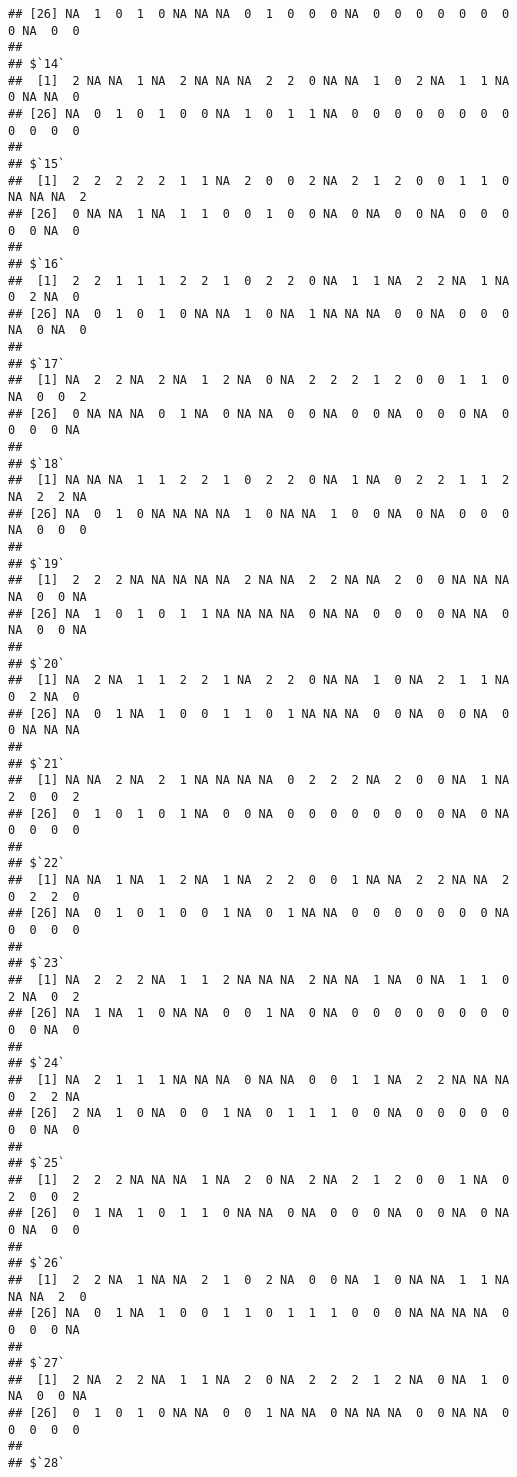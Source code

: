 \documentclass[
]{article}
\begin{document}
\begin{verbatim}
## [26] NA  1  0  1  0 NA NA NA  0  1  0  0  0 NA  0  0  0  0  0  0  0  0 NA  0  0
## 
## $`14`
##  [1]  2 NA NA  1 NA  2 NA NA NA  2  2  0 NA NA  1  0  2 NA  1  1 NA  0 NA NA  0
## [26] NA  0  1  0  1  0  0 NA  1  0  1  1 NA  0  0  0  0  0  0  0  0  0  0  0  0
## 
## $`15`
##  [1]  2  2  2  2  2  1  1 NA  2  0  0  2 NA  2  1  2  0  0  1  1  0 NA NA NA  2
## [26]  0 NA NA  1 NA  1  1  0  0  1  0  0 NA  0 NA  0  0 NA  0  0  0  0  0 NA  0
## 
## $`16`
##  [1]  2  2  1  1  1  2  2  1  0  2  2  0 NA  1  1 NA  2  2 NA  1 NA  0  2 NA  0
## [26] NA  0  1  0  1  0 NA NA  1  0 NA  1 NA NA NA  0  0 NA  0  0  0 NA  0 NA  0
## 
## $`17`
##  [1] NA  2  2 NA  2 NA  1  2 NA  0 NA  2  2  2  1  2  0  0  1  1  0 NA  0  0  2
## [26]  0 NA NA NA  0  1 NA  0 NA NA  0  0 NA  0  0 NA  0  0  0 NA  0  0  0  0 NA
## 
## $`18`
##  [1] NA NA NA  1  1  2  2  1  0  2  2  0 NA  1 NA  0  2  2  1  1  2 NA  2  2 NA
## [26] NA  0  1  0 NA NA NA NA  1  0 NA NA  1  0  0 NA  0 NA  0  0  0 NA  0  0  0
## 
## $`19`
##  [1]  2  2  2 NA NA NA NA NA  2 NA NA  2  2 NA NA  2  0  0 NA NA NA NA  0  0 NA
## [26] NA  1  0  1  0  1  1 NA NA NA NA  0 NA NA  0  0  0  0 NA NA  0 NA  0  0 NA
## 
## $`20`
##  [1] NA  2 NA  1  1  2  2  1 NA  2  2  0 NA NA  1  0 NA  2  1  1 NA  0  2 NA  0
## [26] NA  0  1 NA  1  0  0  1  1  0  1 NA NA NA  0  0 NA  0  0 NA  0  0 NA NA NA
## 
## $`21`
##  [1] NA NA  2 NA  2  1 NA NA NA NA  0  2  2  2 NA  2  0  0 NA  1 NA  2  0  0  2
## [26]  0  1  0  1  0  1 NA  0  0 NA  0  0  0  0  0  0  0  0 NA  0 NA  0  0  0  0
## 
## $`22`
##  [1] NA NA  1 NA  1  2 NA  1 NA  2  2  0  0  1 NA NA  2  2 NA NA  2  0  2  2  0
## [26] NA  0  1  0  1  0  0  1 NA  0  1 NA NA  0  0  0  0  0  0  0 NA  0  0  0  0
## 
## $`23`
##  [1] NA  2  2  2 NA  1  1  2 NA NA NA  2 NA NA  1 NA  0 NA  1  1  0  2 NA  0  2
## [26] NA  1 NA  1  0 NA NA  0  0  1 NA  0 NA  0  0  0  0  0  0  0  0  0  0 NA  0
## 
## $`24`
##  [1] NA  2  1  1  1 NA NA NA  0 NA NA  0  0  1  1 NA  2  2 NA NA NA  0  2  2 NA
## [26]  2 NA  1  0 NA  0  0  1 NA  0  1  1  1  0  0 NA  0  0  0  0  0  0  0 NA  0
## 
## $`25`
##  [1]  2  2  2 NA NA NA  1 NA  2  0 NA  2 NA  2  1  2  0  0  1 NA  0  2  0  0  2
## [26]  0  1 NA  1  0  1  1  0 NA NA  0 NA  0  0  0 NA  0  0 NA  0 NA  0 NA  0  0
## 
## $`26`
##  [1]  2  2 NA  1 NA NA  2  1  0  2 NA  0  0 NA  1  0 NA NA  1  1 NA NA NA  2  0
## [26] NA  0  1 NA  1  0  0  1  1  0  1  1  1  0  0  0 NA NA NA NA  0  0  0  0 NA
## 
## $`27`
##  [1]  2 NA  2  2 NA  1  1 NA  2  0 NA  2  2  2  1  2 NA  0 NA  1  0 NA  0  0 NA
## [26]  0  1  0  1  0 NA NA  0  0  1 NA NA  0 NA NA NA  0  0 NA NA  0  0  0  0  0
## 
## $`28`

\end{verbatim}
\end{document}
